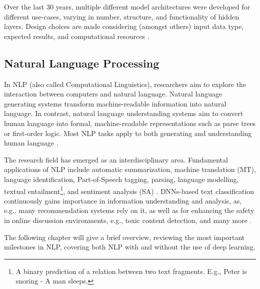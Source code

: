 Over the last 30 years, multiple different model architectures were developed for different use-cases, varying in number, structure, and functionality of hidden layers. Design choices are made considering (amongst others) input data type, expected results, and computational resources \cite{buduma2017fundamentals}. 


\subsection{Natural Language Processing}
\label{sec:natural_language_processing}

In NLP (also called Computational Linguistics), researchers aim to explore the interaction between computers and natural language. Natural language generating systems transform machine-readable information into natural language. In contrast, natural language understanding systems aim to convert human language into formal, machine-readable representations such as parse trees or first-order logic. Most NLP tasks apply to both generating and understanding human language \cite{kumar2011natural}.

The research field has emerged as an interdisciplinary area. Fundamental applications of NLP include automatic summarization, machine translation (MT), language identification, Part-of-Speech tagging, parsing, language modelling, textual entailment\footnote{A binary prediction of a relation between two text fragments. E.g., Peter is snoring - A man sleeps.}, and sentiment analysis (SA) \cite{mani2001automatic, dostert1955georgetown, tang2017phonetic, schmid1994part, bengio2003neural, socher2013recursive,dagan2005pascal, prabowo2009sentiment}. DNNs-based text classification continuously gains importance in information understanding and analysis, as, e.g., many recommendation systems rely on it, as well as for enhancing the safety in online discussion environments, e.g., toxic content detection, and many more \cite{kumar2011natural}. 



The following chapter will give a brief overview, reviewing the most important milestones in NLP, covering both NLP with and without the use of deep learning.

